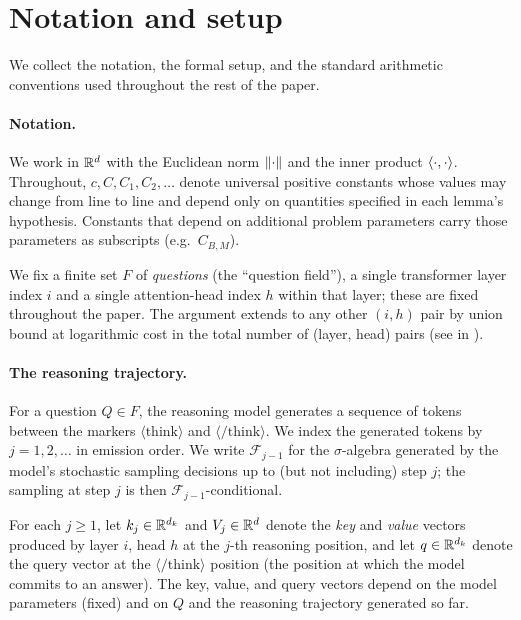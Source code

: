 \section{Notation and setup}
\label{sec:prelim}

We collect the notation, the formal setup, and the standard
arithmetic conventions used throughout the rest of the paper.

\paragraph{Notation.}
We work in $\mathbb{R}^d$ with the Euclidean norm $\left\| \cdot \right\|$ and the inner
product $\left\langle \cdot, \cdot \right\rangle$. Throughout, $c, C, C_1, C_2, \ldots$
denote universal positive constants whose values may change from line to
line and depend only on quantities specified in each lemma's hypothesis.
Constants that depend on additional problem parameters carry those
parameters as subscripts (e.g.\ $C_{B, M}$).

We fix a finite set $F$ of \emph{questions} (the ``question field''), a
single transformer layer index $i$ and a single attention-head index $h$
within that layer; these are fixed throughout the paper. The argument
extends to any other $(i, h)$ pair by union bound at logarithmic cost in
the total number of (layer, head) pairs (see 
in ).

\paragraph{The reasoning trajectory.}
For a question $Q \in F$, the reasoning model generates a sequence of
tokens between the markers $\langle\mathrm{think}\rangle$ and
$\langle/\mathrm{think}\rangle$. We index the generated tokens by
$j = 1, 2, \ldots$ in emission order. We write $\mathcal F_{j-1}$ for the
$\sigma$-algebra generated by the model's stochastic sampling decisions up
to (but not including) step $j$; the sampling at step $j$ is then
$\mathcal F_{j-1}$-conditional.

For each $j \ge 1$, let $k_j \in \mathbb{R}^{d_k}$ and $V_j \in \mathbb{R}^d$ denote the
\emph{key} and \emph{value} vectors produced by layer $i$, head $h$ at the
$j$-th reasoning position, and let $q \in \mathbb{R}^{d_k}$ denote the query
vector at the $\langle/\mathrm{think}\rangle$ position (the position at
which the model commits to an answer). The key, value, and query vectors
depend on the model parameters (fixed) and on $Q$ and the reasoning
trajectory generated so far.

